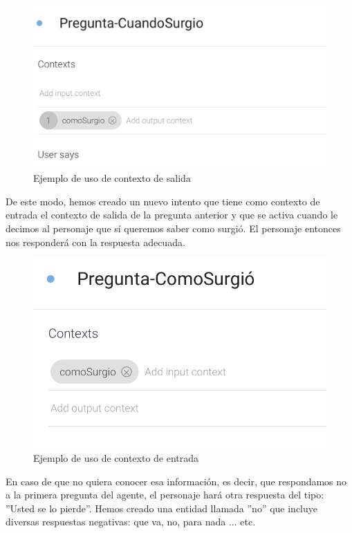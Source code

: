 \begin{figure}[H] %
	\centering
	\includegraphics[scale=0.4]{imagenes/contextOut.png}  %
	\caption{Ejemplo de uso de contexto de salida}
\end{figure}


De este modo, hemos creado un nuevo intento que tiene como contexto de entrada el contexto de salida de la pregunta anterior y que se activa cuando le decimos al personaje que sí queremos saber como surgió. El personaje entonces nos responderá con la respuesta adecuada. \\

\begin{figure}[H] %
	\centering
	\includegraphics[scale=0.4]{imagenes/contextIn.png}  %
	\caption{Ejemplo de uso de contexto de entrada}
\end{figure}
En caso de que no quiera conocer esa información, es decir, que respondamos no a la primera pregunta del agente, el personaje hará otra respuesta del tipo: ''Usted se lo pierde''. Hemos creado una entidad llamada ''no'' que incluye diversas respuestas negativas: que va, no, para nada ... etc. \\

